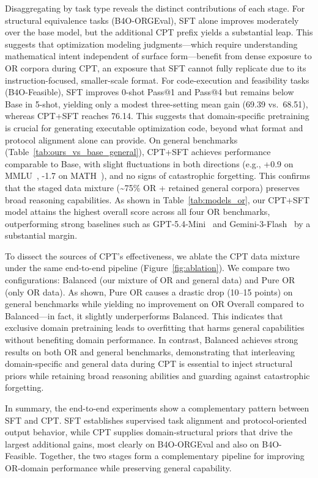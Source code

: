 Disaggregating by task type reveals the distinct contributions of each stage. For structural equivalence tasks (B4O-ORGEval), SFT alone improves moderately over the base model, but the additional CPT prefix yields a substantial leap. This suggests that optimization modeling judgments---which require understanding mathematical intent independent of surface form---benefit from dense exposure to OR corpora during CPT, an exposure that SFT cannot fully replicate due to its instruction-focused, smaller-scale format. For code-execution and feasibility tasks (B4O-Feasible), SFT improves 0-shot Pass@1 and Pass@4 but remains below Base in 5-shot, yielding only a modest three-setting mean gain (69.39 vs.\ 68.51), whereas CPT+SFT reaches 76.14. This suggests that domain-specific pretraining is crucial for generating executable optimization code, beyond what format and protocol alignment alone can provide. On general benchmarks (Table~\ref{tab:ours_vs_base_general}), CPT+SFT achieves performance comparable to Base, with slight fluctuations in both directions (e.g., +0.9 on MMLU~\citep{hendryckstest2021}, -1.7 on MATH~\citep{hendrycks2021measuringmathematicalproblemsolving}), and no signs of catastrophic forgetting. This confirms that the staged data mixture (\textasciitilde 75\% OR + retained general corpora) preserves broad reasoning capabilities. As shown in Table~\ref{tab:models_or}, our CPT+SFT model attains the highest overall score across all four OR benchmarks, outperforming strong baselines such as GPT-5.4-Mini~\citep{openai_gpt_5_4_mini} and Gemini-3-Flash~\citep{google_gemini_flash} by a substantial margin.


To dissect the sources of CPT's effectiveness, we ablate the CPT data mixture under the same end-to-end pipeline (Figure~\ref{fig:ablation}). We compare two configurations: Balanced (our mixture of OR and general data) and Pure OR (only OR data). As shown, Pure OR causes a drastic drop (10–15 points) on general benchmarks while yielding no improvement on OR Overall compared to Balanced---in fact, it slightly underperforms Balanced. This indicates that exclusive domain pretraining leads to overfitting that harms general capabilities without benefiting domain performance. In contrast, Balanced achieves strong results on both OR and general benchmarks, demonstrating that interleaving domain-specific and general data during CPT is essential to inject structural priors while retaining broad reasoning abilities and guarding against catastrophic forgetting.

In summary, the end-to-end experiments show a complementary pattern between
SFT and CPT. SFT establishes supervised task alignment and protocol-oriented
output behavior, while CPT supplies domain-structural priors that drive the
largest additional gains, most clearly on B4O-ORGEval and also on
B4O-Feasible. Together, the two stages form a complementary pipeline for
improving OR-domain performance while preserving general capability.


